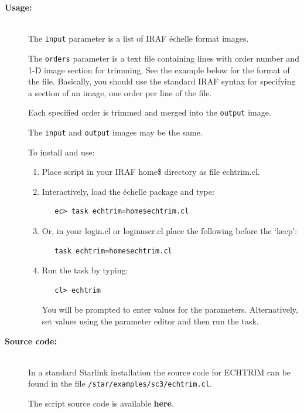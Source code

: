 \documentclass[twoside,11pt]{article}
\newcommand{\htmladdnormallink}[2]{#1}
\newcommand{\htmlref}[2]{#1}
\newenvironment{latexonly}{}{}
\renewcommand{\_}{\texttt{\symbol{95}}}
\begin{document}
\begin{description}
\item [{\bf Usage:}] \mbox{} \\
     The \verb+input+ parameter is a list of IRAF \'{e}chelle format images.

     The \verb+orders+ parameter is a text file containing lines with order
     number and 1-D image section for trimming.  See the example below
     for the format of the file.  Basically, you should use the standard
     IRAF syntax for specifying a section of an image, one order per line
     of the file.

     Each specified order is trimmed and merged into the \verb+output+ image.

     The \verb+input+ and \verb+output+ images may be the same.

     To install and use:

\begin{enumerate}

\item Place script in your IRAF home\$ directory as file echtrim.cl.

\item Interactively, load the \'{e}chelle package and type:

\begin{verbatim}
   ec> task echtrim=home$echtrim.cl
\end{verbatim}

\item Or, in your login.cl or loginuser.cl place the following before
      the `keep':

\begin{verbatim}
   task echtrim=home$echtrim.cl
\end{verbatim}

\item Run the task by typing:

\begin{verbatim}
   cl> echtrim
\end{verbatim}

      You will be prompted
      to enter values for the parameters. Alternatively, set values
      using the parameter editor and then run the task.
\end{enumerate}

\item [{\bf Source code:}] \mbox{} \\
\begin{latexonly}
In a standard Starlink installation the source code for ECHTRIM can be found
in the file \texttt{/star/examples/sc3/echtrim.cl}.
\end{latexonly}
\begin{htmlonly}
      The script source code is available
      \htmlref{{\bf here}}{se_echtrim_source}.
\end{htmlonly}


\end{description}
\end{document}
